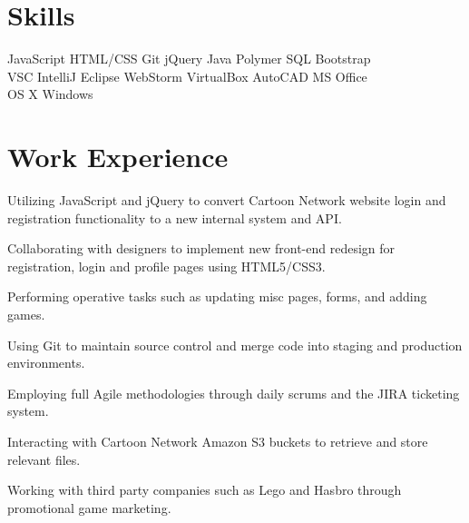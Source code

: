 \documentclass[]{deedy-resume-openfont}
\begin{document}
\begin{minipage}[t]{0.66\textwidth}


\section{Skills}
JavaScript \textbullet{} HTML/CSS \textbullet{} Git \textbullet{} jQuery \textbullet{} Java \textbullet{} Polymer \textbullet{} SQL \textbullet{} Bootstrap\\
VSC \textbullet{} IntelliJ \textbullet{} Eclipse \textbullet{} WebStorm \textbullet{} VirtualBox \textbullet{} AutoCAD \textbullet{} MS Office \\
OS X \textbullet{} Windows \\
\sectionsep


\section{Work Experience}
\vspace{\topsep} %
\begin{tightemize}
\item Utilizing JavaScript and jQuery to convert Cartoon Network website login and registration functionality to a new internal system and API.
\item Collaborating with designers to implement new front-end redesign for registration, login and profile pages using HTML5/CSS3.
\item Performing operative tasks such as updating misc pages, forms, and adding games.
\item Using Git to maintain source control and merge code into staging and production environments.
\item Employing full Agile methodologies through daily scrums and the JIRA ticketing system.
\item Interacting with Cartoon Network Amazon S3 buckets to retrieve and store relevant files.
\item Working with third party companies such as Lego and Hasbro through promotional game marketing.
\end{tightemize}
\sectionsep


\end{minipage}
\end{document}

